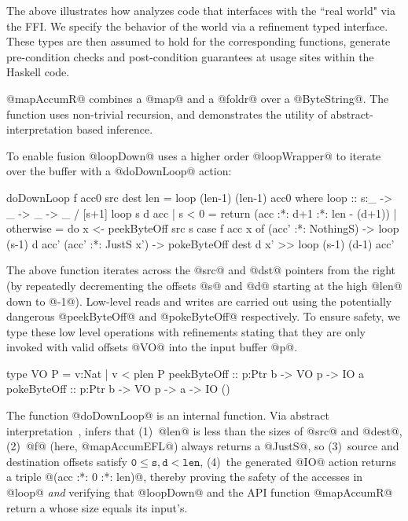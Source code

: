 The above illustrates how \toolname analyzes code that interfaces 
with the ``real world" via the \C FFI. We specify the behavior 
of the world via a refinement typed interface. These types are then assumed
to hold for the corresponding functions, \ie generate pre-condition checks
and post-condition guarantees at usage sites within the Haskell code.


@mapAccumR@ combines a @map@ and a @foldr@ over a @ByteString@. 
The function uses non-trivial recursion, and demonstrates 
the utility of abstract-interpretation based inference. 
%
To enable fusion \cite{streamfusion} 
@loopDown@ uses a higher order @loopWrapper@ 
to iterate over the buffer with a @doDownLoop@ action:
%
\begin{code}
  doDownLoop f acc0 src dest len 
    = loop (len-1) (len-1) acc0
    where
     loop :: s:_ -> _ -> _ -> _ / [s+1]
     loop s d acc
       | s < 0 
       = return (acc :*: d+1 :*: len - (d+1))
       | otherwise       
       = do x <- peekByteOff src s
            case f acc x of
              (acc' :*: NothingS) -> 
                   loop (s-1) d acc'
              (acc' :*: JustS x') -> 
                   pokeByteOff dest d x'
                >> loop (s-1) (d-1) acc'
\end{code}

The above function iterates across the @src@ and @dst@ 
pointers from the right (by repeatedly decrementing the 
offsets @s@ and @d@ starting at the high @len@ down to @-1@). 
Low-level reads and writes are carried out using the 
potentially dangerous @peekByteOff@ and @pokeByteOff@ 
respectively. To ensure safety, we type these low level 
operations with refinements stating that they are only 
invoked with valid offsets @VO@ into the input buffer @p@.

\begin{code}
  type VO P    = {v:Nat | v < plen P}
  peekByteOff :: p:Ptr b -> VO p -> IO a
  pokeByteOff :: p:Ptr b -> VO p -> a -> IO ()
\end{code}

The function @doDownLoop@ is an internal function.
Via abstract interpretation~\cite{LiquidPLDI08}, 
\toolname infers that
%
(1)~@len@ is less than the sizes of @src@ and @dest@,
(2)~@f@ (here, @mapAccumEFL@) always returns a @JustS@, so
(3)~source and destination offsets satisfy $$,
(4)~the generated @IO@ action returns a triple @(acc :*: 0 :*: len)@,
%
thereby proving the safety of the accesses in @loop@ \emph{and}
verifying that @loopDown@ and the API function @mapAccumR@ 
return a \bytestring whose size equals its input's.
 
